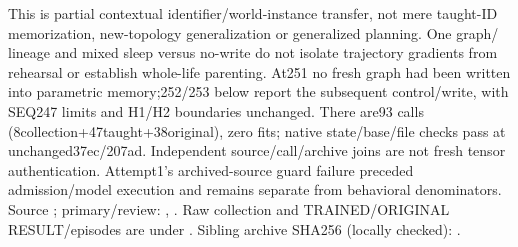 \documentclass{article}
\begin{document}
This is partial contextual identifier/world-instance transfer, not mere taught-ID
memorization, new-topology generalization or generalized planning. One graph/
lineage and mixed sleep versus no-write do not isolate trajectory gradients
from rehearsal or establish whole-life parenting. At251 no fresh graph had
been written into parametric memory;252/253 below report the subsequent
control/write, with SEQ247 limits and H1/H2 boundaries unchanged. There are93 calls
(8collection+47taught+38original), zero fits; native state/base/file checks pass
at unchanged37ec/207ad. Independent source/call/archive joins are not fresh
tensor authentication. Attempt1's archived-source guard failure preceded
admission/model execution and remains separate from behavioral denominators.
Source ; primary/review:
,
.
Raw collection and TRAINED/ORIGINAL RESULT/episodes are under
.
Sibling archive SHA256 (locally checked):
.
\end{document}
